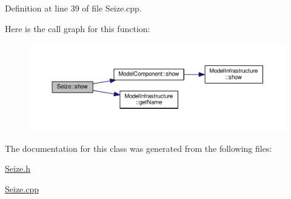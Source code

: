 Definition at line 39 of file Seize.\-cpp.



Here is the call graph for this function\-:\nopagebreak
\begin{figure}[H]
\begin{center}
\leavevmode
\includegraphics[width=350pt]{class_seize_a495ace3a156680b5816c8b285135322c_cgraph}
\end{center}
\end{figure}




The documentation for this class was generated from the following files\-:\begin{DoxyCompactItemize}
\item 
\hyperlink{_seize_8h}{Seize.\-h}\item 
\hyperlink{_seize_8cpp}{Seize.\-cpp}\end{DoxyCompactItemize}
